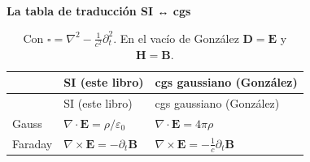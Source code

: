 \documentclass[
  spanish,
  a4paper,
]{scrbook}
\theoremstyle{definition}
\theoremstyle{plain}
\theoremstyle{definition}
\theoremstyle{plain}
\theoremstyle{definition}
\theoremstyle{remark}
\begin{document}
\begin{tcolorbox}[enhanced jigsaw, arc=.35mm, bottomrule=.15mm, breakable, colback=white, colframe=quarto-callout-note-color-frame, left=2mm, leftrule=.75mm, opacityback=0, rightrule=.15mm, toprule=.15mm]
\begin{minipage}[t]{5.5mm}
\textcolor{quarto-callout-note-color}{\faInfo}
\end{minipage}%
\begin{minipage}[t]{\textwidth - 5.5mm}

\vspace{-3mm}\textbf{La tabla de traducción SI ↔ cgs}\vspace{3mm}

\begin{longtable}[]{@{}
  >{\raggedright\arraybackslash}p{}
  >{\raggedright\arraybackslash}p{}
  >{\raggedright\arraybackslash}p{}@{}}
\caption{Con \(\square = \nabla^2 - \tfrac{1}{c^2}\partial_t^2\). En el
vacío de González \(\mathbf D = \mathbf E\) y
\(\mathbf H = \mathbf B\).}\label{tbl-hip-si-cgs}\tabularnewline
\toprule\noalign{}
\begin{minipage}[b]{\linewidth}\raggedright
\end{minipage} & \begin{minipage}[b]{\linewidth}\raggedright
SI (este libro)
\end{minipage} & \begin{minipage}[b]{\linewidth}\raggedright
cgs gaussiano (González)
\end{minipage} \\
\midrule\noalign{}
\endfirsthead
\toprule\noalign{}
\begin{minipage}[b]{\linewidth}\raggedright
\end{minipage} & \begin{minipage}[b]{\linewidth}\raggedright
SI (este libro)
\end{minipage} & \begin{minipage}[b]{\linewidth}\raggedright
cgs gaussiano (González)
\end{minipage} \\
\midrule\noalign{}
\endhead
\bottomrule\noalign{}
\endlastfoot
Gauss & \(\nabla\cdot\mathbf E = \rho/\varepsilon_0\) &
\(\nabla\cdot\mathbf E = 4\pi\rho\) \\
Faraday & \(\nabla\times\mathbf E = -\partial_t\mathbf B\) &
\(\nabla\times\mathbf E = -\tfrac1c\partial_t\mathbf B\) \\

\end{longtable}
\end{minipage}
\end{tcolorbox}
\end{document}
